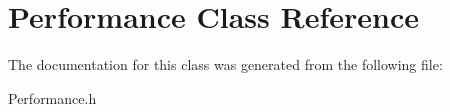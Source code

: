 \hypertarget{classPerformance}{}\section{Performance Class Reference}
\label{classPerformance}


The documentation for this class was generated from the following file\+:\begin{DoxyCompactItemize}
\item 
Performance.\+h\end{DoxyCompactItemize}
